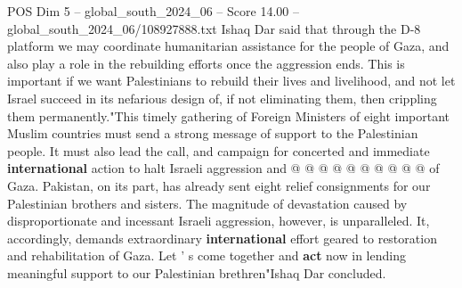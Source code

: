 \begin{textsample}{POS Dim 5 – global\_south\_2024\_06 – Score 14.00 – global\_south\_2024\_06/108927888.txt}
Ishaq Dar said that through the D-8 platform we may coordinate humanitarian assistance for the people of Gaza, and also play a role in the rebuilding efforts once the aggression ends.
This is important if we want Palestinians to rebuild their lives and livelihood, and not let Israel succeed in its nefarious design of, if not eliminating them, then crippling them permanently."This timely gathering of Foreign Ministers of eight important Muslim countries must send a strong message of support to the Palestinian people.
It must also lead the call, and campaign for concerted and immediate \textbf{international} action to halt Israeli aggression and @ @ @ @ @ @ @ @ @ @ of Gaza.
Pakistan, on its part, has already sent eight relief consignments for our Palestinian brothers and sisters.
The magnitude of devastation caused by disproportionate and incessant Israeli aggression, however, is unparalleled.
It, accordingly, demands extraordinary \textbf{international} effort geared to restoration and rehabilitation of Gaza.
Let ' s come together and \textbf{act} now in lending meaningful support to our Palestinian brethren"Ishaq Dar concluded.

\end{textsample}
